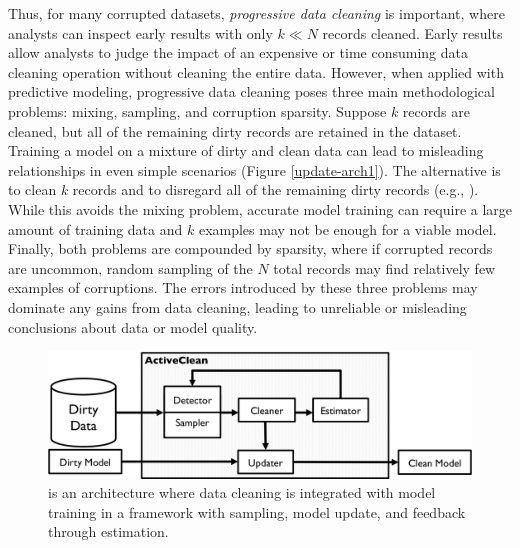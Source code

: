 Thus, for many corrupted datasets, \emph{progressive data cleaning} is important, where analysts can inspect early results with only $k \ll N$ records cleaned.
Early results allow analysts to judge the impact of an expensive or time consuming data cleaning operation without cleaning the entire data.
However, when applied with predictive modeling, progressive data cleaning poses three main methodological problems: mixing, sampling, and corruption sparsity.
Suppose $k$ records are cleaned, but all of the remaining dirty records are retained in the dataset.
Training a model on a mixture of dirty and clean data can lead to misleading relationships in even simple scenarios (Figure \ref{update-arch1}).
The alternative is to clean $k$ records and to disregard all of the remaining dirty records (e.g., \cite{wang1999sample}).
While this avoids the mixing problem, accurate model training can require a large amount of training data and $k$ examples may not be enough for a viable model.
Finally, both problems are compounded by sparsity, where if corrupted records are uncommon, random sampling of the $N$ total records may find relatively few examples of corruptions.
The errors introduced by these three problems may dominate any gains from data cleaning, leading to unreliable or misleading conclusions about data or model quality.

\begin{figure}[t]
\centering
 \includegraphics[width=\columnwidth]{figs/arch.png}
 \caption{\sysfull is an architecture where data cleaning is integrated with model training in a framework with sampling, model update, and feedback through estimation. \label{sys-arch}}\vspace{-2em}
\end{figure}

